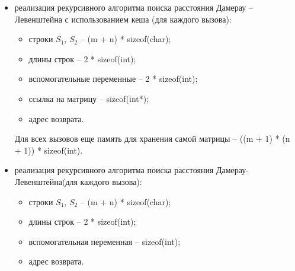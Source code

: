 \begin{itemize}
	\item реализация рекурсивного алгоритма поиска расстояния Дамерау -- Левенштейна с использованием кеша (для каждого вызова):
	\begin{itemize}
		\item строки $S_{1}$, $S_{2}$ -- (m + n) * sizeof(char);
		\item длины строк -- 2 * sizeof(int);
		\item вспомогательные переменные --  2 * sizeof(int);
		\item ссылка на матрицу -- sizeof(int*);
		\item адрес возврата.
	\end{itemize}
	Для всех вызовов еще память для хранения самой матрицы -- ((m + 1) * (n + 1)) * sizeof(int).
	\item реализация рекурсивного алгоритма поиска расстояния Дамерау-Левенштейна(для каждого вызова):\begin{itemize}
		\item строки $S_{1}$, $S_{2}$ -- (m + n) * sizeof(char);
		\item длины строк -- 2 * sizeof(int);
		\item вспомогательная переменная -- sizeof(int);
		\item адрес возврата.
	\end{itemize}
\end{itemize}
